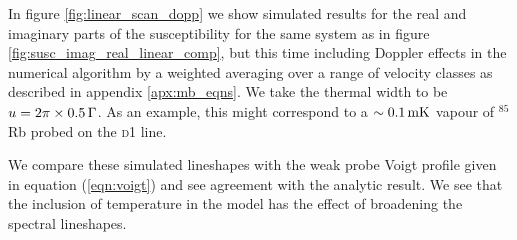     In figure \ref{fig:linear_scan_dopp} we show simulated results for the
    real and imaginary parts of the susceptibility for the same system as in
    figure  \ref{fig:susc_imag_real_linear_comp}, but this time including
    Doppler effects in the numerical algorithm by a weighted averaging over a
    range of velocity classes as described in appendix \ref{apx:mb_eqns}. We
    take the thermal width to be $u = \unit[2\pi\times0.5]{\Gamma}$. As an
    example, this might correspond to a $\unit[\sim0.1]{mK}$ vapour of
    ${^{85}}$Rb probed on the \textsc{d1} line.

    We compare these simulated lineshapes with the weak probe Voigt profile
    given in equation (\ref{eqn:voigt}) and see agreement with the analytic
    result. We see that the inclusion of temperature in the model has the effect
    of broadening the spectral lineshapes.

